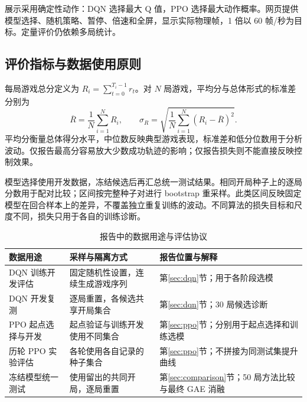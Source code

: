展示采用确定性动作：DQN 选择最大 Q 值，PPO 选择最大动作概率。网页提供模型选择、随机策略、暂停、倍速和全屏，显示实际物理帧，1 倍以 60 帧/秒为目标。定量评价仍依赖多局统计。

\subsection{评价指标与数据使用原则}
每局游戏总分定义为 $R_i=\sum_{t=0}^{T_i-1}r_t$。对 $N$ 局游戏，平均分与总体形式的标准差分别为
\begin{equation}
 \overline R=\frac{1}{N}\sum_{i=1}^{N}R_i,\qquad
 \sigma_R=\sqrt{\frac{1}{N}\sum_{i=1}^{N}(R_i-\overline R)^2}.
\end{equation}
平均分衡量总体得分水平，中位数反映典型游戏表现，标准差和低分位数用于分析波动。仅报告最高分容易放大少数成功轨迹的影响；仅报告损失则不能直接反映控制效果。

模型选择使用开发数据，冻结候选后再汇总统一测试结果。相同开局种子上的逐局分数用于配对比较；区间按完整种子对进行 bootstrap 重采样。此类区间反映固定模型在回合样本上的差异，不覆盖独立重复训练的波动。不同算法的损失目标和尺度不同，损失只用于各自的训练诊断。

\begin{table}[!htbp]
 \centering\footnotesize
 \caption{报告中的数据用途与评估协议}\label{tab:data-protocols}
 \begin{tabularx}{\linewidth}{P{3.1cm}P{3.8cm}Y}
 \toprule
 数据用途 & 采样与隔离方式 & 报告位置与解释\\
 \midrule
 DQN 训练开发评估 & 固定随机性设置，连续生成游戏序列 & 第\ref{sec:dqn}节；用于各阶段选模\\
 DQN 开发复测 & 逐局重置，各候选共享开局集合 & 第\ref{sec:dqn}节；30 局候选诊断\\
 PPO 起点选择与开发 & 起点验证与训练开发使用不同集合 & 第\ref{sec:ppo}节；分别用于起点选择和训练选模\\
 历轮 PPO 实验评估 & 各轮使用各自记录的种子集合 & 第\ref{sec:ppo}节；不拼接为同测试集提升曲线\\
 冻结模型统一测试 & 使用留出的共同开局，逐局重置 & 第\ref{sec:comparison}节；50 局方法比较与最终 GAE 消融\\
 \bottomrule
 \end{tabularx}
\end{table}


\FloatBarrier

